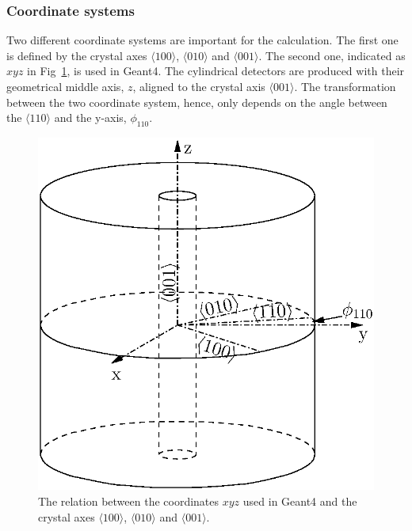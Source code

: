 \documentclass[epj]{svjour}
\begin{document}
\subsubsection{Coordinate systems} 
\label{s:xyz}
Two different coordinate systems are important for the
calculation. The first one is defined by the crystal axes $\langle 100
\rangle$, $\langle 010 \rangle$ and $\langle 001 \rangle$. The second
one, indicated as $xyz$ in Fig~\ref{f:coo}, is used in Geant4. The
cylindrical detectors are produced with their geometrical middle axis,
$z$, aligned to the crystal axis $\langle 001 \rangle$. The
transformation between the two coordinate system, hence, only depends
on the angle between the $\langle 110 \rangle$ and the y-axis,
$\phi_{110}$.
\begin{figure}\centering
\includegraphics[width=0.6\linewidth]{coordins}   
\caption{The relation between the coordinates $xyz$ used in Geant4 and
the crystal axes $\langle 100 \rangle$, $\langle 010 \rangle$ and
$\langle 001 \rangle$.}
\label{f:coo} 
\end{figure} 
 
\end{document}
